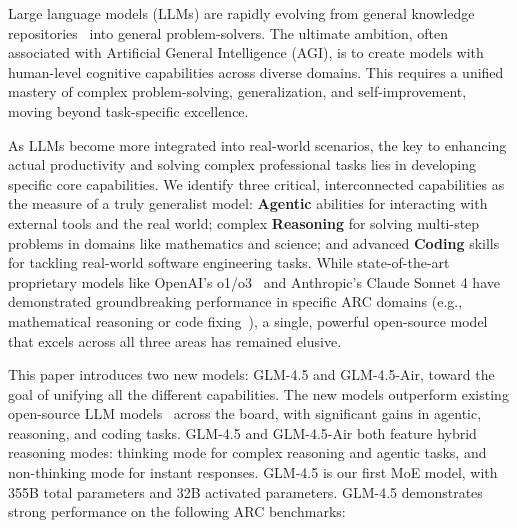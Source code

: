 
Large language models (LLMs) are rapidly evolving from general knowledge repositories~\cite{brown2020language,touvron2023llama,zengglm,team2023gemini,liu2024deepseek} into general problem-solvers. The ultimate ambition, often associated with Artificial General Intelligence (AGI), is to create models with human-level cognitive capabilities across diverse domains. This requires a unified mastery of complex problem-solving, generalization, and self-improvement, moving beyond task-specific excellence.

As LLMs become more integrated into real-world scenarios, the key to enhancing actual productivity and solving complex professional tasks lies in developing specific core capabilities.
We identify three critical, interconnected capabilities as the measure of a truly generalist model: \textbf{Agentic} abilities for interacting with external tools and the real world; complex \textbf{Reasoning} for solving multi-step problems in domains like mathematics and science; and advanced \textbf{Coding} skills for tackling real-world software engineering tasks. While state-of-the-art proprietary models like OpenAI's o1/o3~\cite{jaech2024openai} and Anthropic's Claude Sonnet 4 have demonstrated groundbreaking performance in specific ARC domains (e.g., mathematical reasoning or code fixing~\cite{jimenez2023swe}), a single, powerful open-source model that excels across all three areas has remained elusive.

This paper introduces two new models: GLM-4.5 and GLM-4.5-Air, toward the goal of unifying all the different capabilities.
The new models outperform existing open-source LLM models~\cite{guo2025deepseek,team2025kimi,yang2025qwen3} across the board, with significant gains in agentic, reasoning, and coding tasks. GLM-4.5 and GLM-4.5-Air both feature hybrid reasoning modes: thinking mode for complex reasoning and agentic tasks, and non-thinking mode for instant responses. GLM-4.5 is our first MoE model, with 355B total parameters and 32B activated parameters. GLM-4.5 demonstrates strong performance on the following ARC benchmarks:

